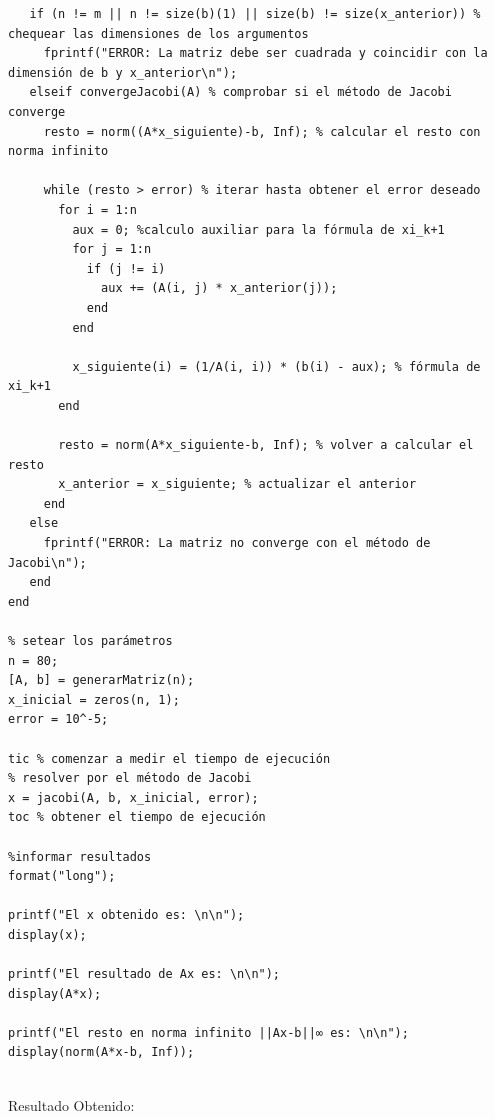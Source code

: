 \documentclass{article}
\begin{document}
\begin{lstlisting}
   if (n != m || n != size(b)(1) || size(b) != size(x_anterior)) % chequear las dimensiones de los argumentos
     fprintf("ERROR: La matriz debe ser cuadrada y coincidir con la dimensión de b y x_anterior\n");
   elseif convergeJacobi(A) % comprobar si el método de Jacobi converge
     resto = norm((A*x_siguiente)-b, Inf); % calcular el resto con norma infinito

     while (resto > error) % iterar hasta obtener el error deseado
       for i = 1:n
         aux = 0; %calculo auxiliar para la fórmula de xi_k+1
         for j = 1:n
           if (j != i)
             aux += (A(i, j) * x_anterior(j));
           end
         end

         x_siguiente(i) = (1/A(i, i)) * (b(i) - aux); % fórmula de xi_k+1
       end

       resto = norm(A*x_siguiente-b, Inf); % volver a calcular el resto
       x_anterior = x_siguiente; % actualizar el anterior
     end
   else
     fprintf("ERROR: La matriz no converge con el método de Jacobi\n");
   end
end

% setear los parámetros
n = 80;
[A, b] = generarMatriz(n);
x_inicial = zeros(n, 1);
error = 10^-5;

tic % comenzar a medir el tiempo de ejecución
% resolver por el método de Jacobi
x = jacobi(A, b, x_inicial, error);
toc % obtener el tiempo de ejecución

%informar resultados
format("long");

printf("El x obtenido es: \n\n");
display(x);

printf("El resultado de Ax es: \n\n");
display(A*x);

printf("El resto en norma infinito ||Ax-b||∞ es: \n\n");
display(norm(A*x-b, Inf));
\end{lstlisting} \\

Resultado Obtenido:
\end{document}
